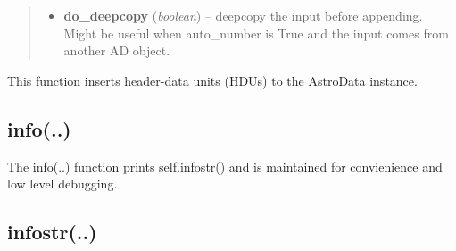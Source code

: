 \documentclass[letterpaper,10pt,english]{sphinxmanual}
\begin{document}
\begin{fulllineitems}
\begin{quote}
\begin{description}
\begin{itemize}
\item {} 
\textbf{do\_deepcopy} (\emph{boolean}) -- deepcopy the input before appending.  Might be useful
when auto\_number is True and the input comes from another AD object.

\end{itemize}

\end{description}\end{quote}

This function inserts header-data units (HDUs) to the AstroData
instance.

\end{fulllineitems}



\subsection{info(..)}
\label{chapter_AstroDataClass:info}

\begin{fulllineitems}
\label{chapter_AstroDataClass:astrodata.data.AstroData.info}
The info(..) function prints self.infostr() and 
is maintained for convienience and low level debugging.

\end{fulllineitems}



\subsection{infostr(..)}
\label{chapter_AstroDataClass:infostr}
\end{document}
